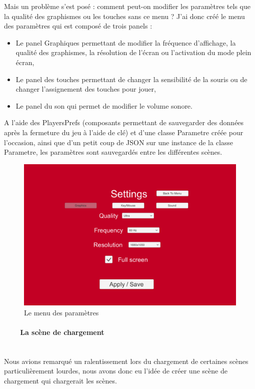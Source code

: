 \documentclass[titlepage, 13px, a4paper]{report}
\begin{document}
Mais un problème s’est posé : comment peut-on modifier les paramètres tels que la qualité des graphismes ou les touches sans ce menu ?
J’ai donc créé le menu des paramètres qui est composé de trois panels : \\
{\begin{itemize}
	\item Le panel Graphiques permettant de modifier la fréquence d’affichage, la qualité des graphismes, la résolution 
	de l’écran ou l’activation du mode plein écran,
	\item Le panel des touches permettant de changer la sensibilité de la souris ou de changer l’assignement des touches pour jouer,
	\item Le panel du son qui permet de modifier le volume sonore. \\
\end{itemize}}
A l’aide des PlayersPrefs (composants permettant de sauvegarder des données après la fermeture du jeu à l’aide de clé) 
et d’une classe Parametre créée pour l’occasion, ainsi que d’un petit coup de JSON sur une instance de la classe Parametre, 
les paramètres sont sauvegardés entre les différentes scènes. \\

\begin{figure}[h!]
  \centering
  \includegraphics[scale=0.3]{images/cedric_parametre.png}
  \caption{Le menu des paramètres}
\end{figure}

\paragraph{~~~~La scène de chargement} \hspace{0pt} \\
Nous avions remarqué un ralentissement lors du chargement de certaines scènes particulièrement lourdes, nous avons donc eu 
l’idée de créer une scène de chargement qui chargerait les scènes.
\end{document}
